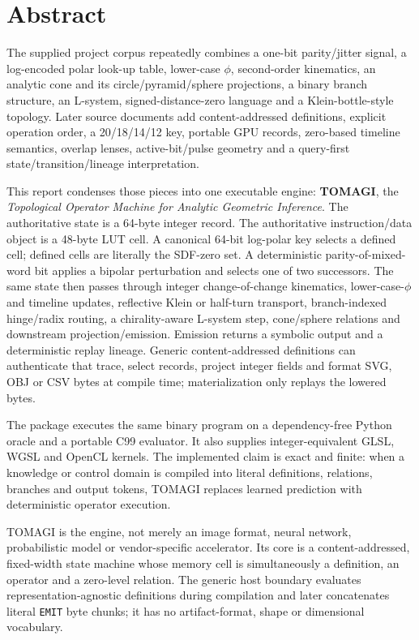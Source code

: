 \documentclass[11pt,a4paper]{article}
\newcommand{\code}[1]{\texttt{#1}}
\begin{document}
\section*{Abstract}
The supplied project corpus repeatedly combines a one-bit parity/jitter signal, a log-encoded polar look-up table, lower-case $\phi$, second-order kinematics, an analytic cone and its circle/pyramid/sphere projections, a binary branch structure, an L-system, signed-distance-zero language and a Klein-bottle-style topology. Later source documents add content-addressed definitions, explicit operation order, a 20/18/14/12 key, portable GPU records, zero-based timeline semantics, overlap lenses, active-bit/pulse geometry and a query-first state/transition/lineage interpretation.

This report condenses those pieces into one executable engine: \textbf{TOMAGI}, the \emph{Topological Operator Machine for Analytic Geometric Inference}. The authoritative state is a 64-byte integer record. The authoritative instruction/data object is a 48-byte LUT cell. A canonical 64-bit log-polar key selects a defined cell; defined cells are literally the SDF-zero set. A deterministic parity-of-mixed-word bit applies a bipolar perturbation and selects one of two successors. The same state then passes through integer change-of-change kinematics, lower-case-$\phi$ and timeline updates, reflective Klein or half-turn transport, branch-indexed hinge/radix routing, a chirality-aware L-system step, cone/sphere relations and downstream projection/emission. Emission returns a symbolic output and a deterministic replay lineage. Generic content-addressed definitions can authenticate that trace, select records, project integer fields and format SVG, OBJ or CSV bytes at compile time; materialization only replays the lowered bytes.

The package executes the same binary program on a dependency-free Python oracle and a portable C99 evaluator. It also supplies integer-equivalent GLSL, WGSL and OpenCL kernels. The implemented claim is exact and finite: when a knowledge or control domain is compiled into literal definitions, relations, branches and output tokens, TOMAGI replaces learned prediction with deterministic operator execution.

\begin{decisionbox}
TOMAGI is the engine, not merely an image format, neural network, probabilistic model or vendor-specific accelerator. Its core is a content-addressed, fixed-width state machine whose memory cell is simultaneously a definition, an operator and a zero-level relation. The generic host boundary evaluates representation-agnostic definitions during compilation and later concatenates literal \code{EMIT} byte chunks; it has no artifact-format, shape or dimensional vocabulary.
\end{decisionbox}
\end{document}

